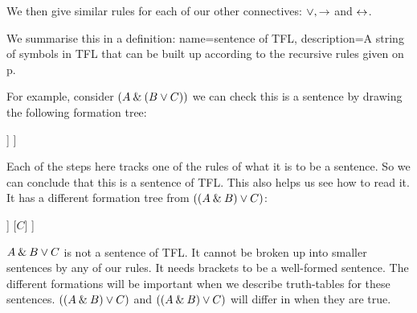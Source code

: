 We then give similar rules for each of our other connectives: $\vee, \rightarrow$ and $\leftrightarrow$.  

We summarise this in a definition:
{
name=sentence of TFL,
description={A string of symbols in TFL that can be built up according to the recursive rules given on p.~\pageref{TFLsentences}}
}

For example, consider $(A \mathbin{\&} (B \vee C))$ we can check this is a sentence by drawing the following formation tree:
\label{S:formationtree}
\begin{center}
\begin{forest}
	[$(A\mainconnective{\eand} (B\eor C))$
		[$A$]
		[$(B\mainconnective{\eor} C)$
			[$B$]
			[$C$]
		]
	]
\end{forest}
\end{center}
Each of the steps here tracks one of the rules of what it is to be a sentence. So we can conclude that this is a sentence of TFL. This also helps us see how to read it.
It has a different formation tree from $((A\mathbin{\&} B)\vee C)$:
\begin{center}
\begin{forest}
	[$((A{\eand} B)\mainconnective{\eor} C))$
		[$(A\mainconnective{\eand} B)$
			[$A$]
			[$B$]
		]
		[$C$]
	]
\end{forest}
\end{center}
$A\mathbin{\&} B\vee C$ is not a sentence of TFL. It cannot be broken up into smaller sentences by any of our rules. It needs brackets to be a well-formed sentence.
The different formations will be important when we describe truth-tables for these sentences. $((A\mathbin{\&} B)\vee C)$ and $((A\mathbin{\&} B)\vee C)$ will differ in when they are true. 



